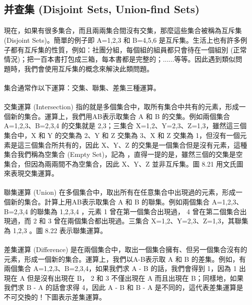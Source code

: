 \documentclass[12pt,a4paper,oneside]{report}
\begin{document}
\begin{CJK}{UTF8}{bkai}
\subsection{并查集 (Disjoint Sets, Union-find Sets)}

\paragraph{}現在，如果有很多集合，而且兩兩集合間沒有交集，那麼這些集合被稱為互斥集 (Disjoint Sets)。簡單的例子即 A={1,2,3} 和 B={4,5,6} 是互斥集。生活上也有許多例子都有互斥集的性質，例如：社團分組，每個組的組員都只會待在一個組別 (正常情況)；把一百本書打包成三箱，每本書都是完整的；......等等。因此遇到類似問題時，我們會使用互斥集的概念來解決此類問題。

\paragraph{}集合通常作以下運算：交集、聯集、差集三種運算。

\paragraph{}交集運算 (Intersection) 指的就是多個集合中，取所有集合中共有的元素，形成一個新的集合。運算上，我們用AB表示取集合 A 和 B 的交集。例如兩個集合 A={1,2,3}、B={2,3,4} 的交集就是 {2,3}；三集合 X={1,2}、Y={2,3}、Z={1,3}，雖然這三個集合中，X 和 Y 的交集為 {2}、Y 和 Z 交集為 {3}、X 和 Z 交集為 {1}，但沒有一個元素是這三個集合所共有的，因此 X、Y、Z 的交集是一個集合但是沒有元素，這種集合我們稱為空集合 (Empty Set)，記為 ，直得一提的是，雖然三個的交集是空集合，但因為兩兩間不為空集合，因此 X、Y、Z 並非互斥集。圖 8.21 用文氏圖來表現交集運算。

\paragraph{}聯集運算 (Union) 在多個集合中，取出所有在任意集合中出現過的元素，形成一個新的集合。計算上用AB表示取集合 A 和 B 的聯集。例如兩個集合 A={1,2,3}、B={2,3,4} 的聯集為 {1,2,3,4} ，元素 1 曾在第一個集合出現過， 4 曾在第二個集合出現過，而 2 和 3 曾在兩個集合都出現過。三集合 X={1,2}、Y={2,3}、Z={1,3}，其聯集為 {1,2,3} 。圖 8.22 表示聯集運算。

\paragraph{}差集運算 (Difference) 是在兩個集合中，取出一個集合擁有、但另一個集合沒有的元素，形成一個新的集合。運算上，我們以A-B表示取 A 和 B 的差集。例如，有兩個集合 A={1,2,3}、B={2,3,4}，如果我們求 A - B 的話，我們會得到 {1}，因為 1 出現在 A 但是沒有出現在 B， 2 和 3 不僅出現在 A 而且出現在 B；同樣地，如果我們求 B - A 的話會求得 {4}，因此 A - B 和 B - A 是不同的，這代表差集運算是不可交換的！下圖表示差集運算。


\end{CJK}
\end{document}
